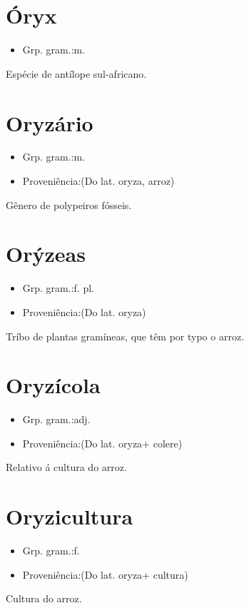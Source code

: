 \section{Óryx}
\begin{itemize}
\item {Grp. gram.:m.}
\end{itemize}
Espécie de antílope sul-africano.
\section{Oryzário}
\begin{itemize}
\item {Grp. gram.:m.}
\end{itemize}
\begin{itemize}
\item {Proveniência:(Do lat. \textunderscore oryza\textunderscore , arroz)}
\end{itemize}
Gênero de polypeiros fósseis.
\section{Orýzeas}
\begin{itemize}
\item {Grp. gram.:f. pl.}
\end{itemize}
\begin{itemize}
\item {Proveniência:(Do lat. \textunderscore oryza\textunderscore )}
\end{itemize}
Tríbo de plantas gramíneas, que têm por typo o arroz.
\section{Oryzícola}
\begin{itemize}
\item {Grp. gram.:adj.}
\end{itemize}
\begin{itemize}
\item {Proveniência:(Do lat. \textunderscore oryza\textunderscore  + \textunderscore colere\textunderscore )}
\end{itemize}
Relativo á cultura do arroz.
\section{Oryzicultura}
\begin{itemize}
\item {Grp. gram.:f.}
\end{itemize}
\begin{itemize}
\item {Proveniência:(Do lat. \textunderscore oryza\textunderscore  + \textunderscore cultura\textunderscore )}
\end{itemize}
Cultura do arroz.
